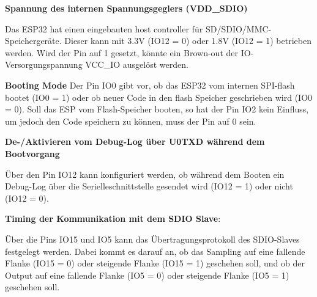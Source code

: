 \textbf{Spannung des internen Spannungsgeglers (VDD\_SDIO)}

Das ESP32 hat einen eingebauten host controller für SD/SDIO/MMC-Speichergeräte. Dieser kann mit 3.3V (IO12 = 0) oder 1.8V (IO12 = 1) betrieben werden. Wird der Pin auf 1 gesetzt, könnte ein Brown-out der IO-Versorgungspannung VCC\_IO ausgelöst werden.

\textbf{Booting Mode}
Der Pin IO0 gibt vor, ob das ESP32 vom internen SPI-flash bootet (IO0 = 1) oder ob neuer Code in den flash Speicher geschrieben wird (IO0 = 0). Soll das ESP vom Flash-Speicher booten, so hat der Pin IO2 kein Einfluss, um jedoch den Code speichern zu können, muss der Pin auf 0 sein.

\textbf{De-/Aktivieren vom Debug-Log über U0TXD während dem Bootvorgang}

Über den Pin IO12 kann konfiguriert werden, ob während dem Booten ein Debug-Log über die Serielleschnittstelle gesendet wird (IO12 = 1) oder nicht (IO12 = 0). 

\textbf{Timing der Kommunikation mit dem SDIO Slave}:

Über die Pins IO15 und IO5 kann das Übertragungsprotokoll des SDIO-Slaves festgelegt werden. Dabei kommt es darauf an, ob das Sampling auf eine fallende Flanke (IO15 = 0) oder steigende Flanke (IO15 = 1) geschehen soll, und ob der Output auf eine fallende Flanke (IO5 = 0) oder steigende Flanke (IO5 = 1) geschehen soll.

\newpage